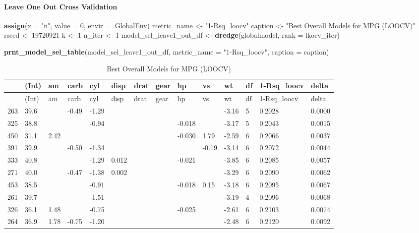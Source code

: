 \documentclass[]{article}
\newenvironment{Shaded}{\begin{snugshade}}{\end{snugshade}}
\newcommand{\KeywordTok}[1]{\textcolor[rgb]{0.13,0.29,0.53}{\textbf{{#1}}}}
\newcommand{\DataTypeTok}[1]{\textcolor[rgb]{0.13,0.29,0.53}{{#1}}}
\newcommand{\DecValTok}[1]{\textcolor[rgb]{0.00,0.00,0.81}{{#1}}}
\newcommand{\StringTok}[1]{\textcolor[rgb]{0.31,0.60,0.02}{{#1}}}
\newcommand{\NormalTok}[1]{{#1}}
\let\oldparagraph\paragraph
\renewcommand{\paragraph}[1]{\oldparagraph{#1}\mbox{}}
\begin{document}
\paragraph{Leave One Out Cross
Validation}\label{leave-one-out-cross-validation}

\begin{Shaded}
\begin{Highlighting}[]
\KeywordTok{assign}\NormalTok{(}\DataTypeTok{x =} \StringTok{"n"}\NormalTok{, }\DataTypeTok{value =} \DecValTok{0}\NormalTok{, }\DataTypeTok{envir =} \NormalTok{.GlobalEnv)}
\NormalTok{metric_name <-}\StringTok{ "1-Rsq_loocv"}
\NormalTok{caption <-}\StringTok{ "Best Overall Models for MPG (LOOCV)"}
\NormalTok{rseed <-}\StringTok{ }\DecValTok{19720921}
\NormalTok{k <-}\StringTok{ }\DecValTok{1}
\NormalTok{n_iter <-}\StringTok{ }\DecValTok{1}
\NormalTok{model_sel_leave1_out_df <-}\StringTok{ }\KeywordTok{dredge}\NormalTok{(globalmodel, }\DataTypeTok{rank =} \NormalTok{lkocv_iter)}
\end{Highlighting}
\end{Shaded}

\begin{Shaded}
\begin{Highlighting}[]
\KeywordTok{prnt_model_sel_table}\NormalTok{(model_sel_leave1_out_df, }\DataTypeTok{metric_name =} \StringTok{"1-Rsq_loocv"}\NormalTok{,}
                     \DataTypeTok{caption =} \NormalTok{caption)}
\end{Highlighting}
\end{Shaded}

\begin{longtable}[]{@{}llllllllllllll@{}}
\caption{Best Overall Models for MPG (LOOCV)}\tabularnewline
\toprule
& (Int) & am & carb & cyl & disp & drat & gear & hp & vs & wt & df &
1-Rsq\_loocv & delta\tabularnewline
\midrule
\endfirsthead
\toprule
& (Int) & am & carb & cyl & disp & drat & gear & hp & vs & wt & df &
1-Rsq\_loocv & delta\tabularnewline
\midrule
\endhead
263 & 39.6 & & -0.49 & -1.29 & & & & & & -3.16 & 5 & 0.2028 &
0.0000\tabularnewline
325 & 38.8 & & & -0.94 & & & & -0.018 & & -3.17 & 5 & 0.2043 &
0.0015\tabularnewline
450 & 31.1 & 2.42 & & & & & & -0.030 & 1.79 & -2.59 & 6 & 0.2066 &
0.0037\tabularnewline
391 & 39.9 & & -0.50 & -1.34 & & & & & -0.19 & -3.14 & 6 & 0.2072 &
0.0044\tabularnewline
333 & 40.8 & & & -1.29 & 0.012 & & & -0.021 & & -3.85 & 6 & 0.2085 &
0.0057\tabularnewline
271 & 40.0 & & -0.47 & -1.38 & 0.002 & & & & & -3.29 & 6 & 0.2090 &
0.0062\tabularnewline
453 & 38.5 & & & -0.91 & & & & -0.018 & 0.15 & -3.18 & 6 & 0.2095 &
0.0067\tabularnewline
261 & 39.7 & & & -1.51 & & & & & & -3.19 & 4 & 0.2096 &
0.0068\tabularnewline
326 & 36.1 & 1.48 & & -0.75 & & & & -0.025 & & -2.61 & 6 & 0.2103 &
0.0074\tabularnewline
264 & 36.9 & 1.78 & -0.75 & -1.20 & & & & & & -2.48 & 6 & 0.2120 &
0.0092\tabularnewline
\bottomrule
\end{longtable}
\end{document}
